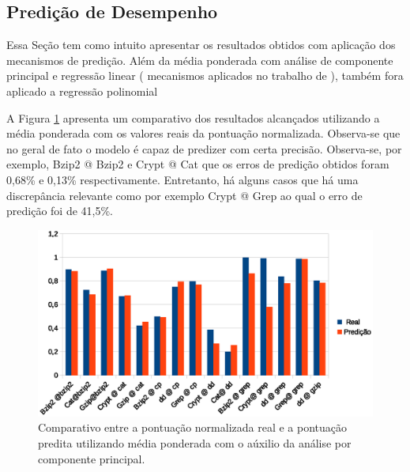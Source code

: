 \documentclass[[10pt,journal]{IEEEtran}
\begin{document}
\subsection{Predição de Desempenho}
\label{sec:performance_predict} 
Essa Seção tem como intuito apresentar os resultados obtidos com aplicação dos mecanismos de predição. Além da média ponderada com análise de componente principal e regressão linear ( mecanismos aplicados no trabalho de \cite{koh2007}), também fora aplicado a regressão polinomial%

A Figura \ref{mean_predict} apresenta um comparativo dos resultados alcançados utilizando a média ponderada com os valores reais da pontuação normalizada. Observa-se que no geral de fato o modelo é capaz de predizer com certa precisão. Observa-se, por exemplo, Bzip2 @ Bzip2 e Crypt @ Cat que os erros de predição obtidos foram 0,68\% e 0,13\% respectivamente. Entretanto, há alguns casos que há uma discrepância relevante como por exemplo Crypt @ Grep ao qual o erro de predição foi de 41,5\%.
   
\begin{figure}[!htb]
\centering
\includegraphics [keepaspectratio=true,scale=0.5]{graficos/mean_predict.eps}
\caption{Comparativo entre a pontuação normalizada real e a pontuação predita utilizando média ponderada com o aúxilio da análise por componente principal.}
\label{mean_predict}
\end{figure}   

\end{document}
